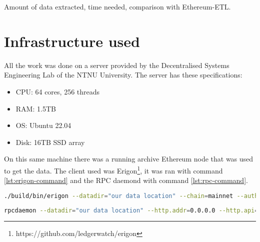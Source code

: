 
Amount of data extracted, time needed, comparison with Ethereum-ETL.

\section{Infrastructure used}

All the work was done on a server provided by the Decentralised Systems Engineering Lab of the NTNU University. The server has these specifications:

\begin{itemize}
    \item CPU: 64 cores, 256 threads
    \item RAM: 1.5TB
    \item OS: Ubuntu 22.04
    \item Disk: 16TB SSD array
\end{itemize}

On this same machine there was a running archive Ethereum node that was used to get the data. The client used was Erigon\footnote{https://github.com/ledgerwatch/erigon}, it was ran with command \ref{lst:erigon-command} and the RPC daemond with command \ref{lst:rpc-command}.

\begin{lstlisting}[language=bash,caption={Erigon command},label={lst:erigon-command},captionpos=b,numbers=none]
./build/bin/erigon --datadir="our data location" --chain=mainnet --authrpc.jwtsecret="JWT secret location" --private.api.addr=0.0.0.0:9090 --http.api=eth,debug,net,trace,web3,erigon
\end{lstlisting}

\begin{lstlisting}[language=bash,caption={RPC daemon command},label={lst:rpc-command},captionpos=b,numbers=none]
rpcdaemon --datadir="our data location" --http.addr=0.0.0.0 --http.api=eth,debug,net,trace,web3,erigon
\end{lstlisting}
